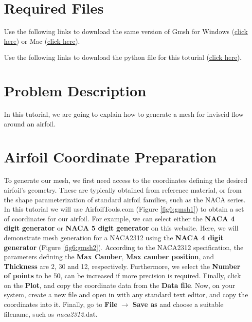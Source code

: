 \section{Required Files}
\begin{gmshnote}
	Use the following links to download the same version of Gmsh for Windows (\href{https://users.encs.concordia.ca/~bvermeir/book/executables/windows/gmsh-3.0.5-Windows64.zip}{\underline{click here}}) or Mac (\href{https://users.encs.concordia.ca/~bvermeir/book/executables/osx/gmsh-3.0.5-MacOSX.dmg}{\underline{click here}}).
\end{gmshnote}
\begin{pythonnote}
	Use the following links to download the python file for this toturial (\href{https://gitlab.com/bvermeir/book-cfd/blob/master/tutorial/tut6_mesh_generation/gmshconverter.py}{\underline{click here}}).
\end{pythonnote}

\section{Problem Description}
In this tutorial, we are going to explain how to generate a mesh for inviscid flow around an airfoil.
\section{Airfoil Coordinate Preparation}
To generate our mesh, we first need access to the coordinates defining the desired airfoil's geometry. These are typically obtained from reference material, or from the shape parameterization of standard airfoil families, such as the NACA series. In this tutorial we will use AirfoilTools.com (Figure \ref{fig6:gmsh1}) to obtain a set of coordinates for our airfoil. For example, we can select either the \textbf{NACA 4 digit generator} or \textbf{NACA 5 digit generator} on this website. Here, we will demonstrate mesh generation for a NACA2312 using the \textbf{NACA 4 digit generator} (Figure \ref{fig6:gmsh2}). According to the NACA2312 specification, the parameters defining the \textbf{Max Camber}, \textbf{Max camber position}, and \textbf{Thickness} are 2, 30 and 12, respectively. Furthermore, we select the \textbf{Number of points} to be 50, can be increased if more precision is required. Finally, click on the \textbf{Plot}, and copy the coordinate data from the \textbf{Data file}. Now, on your system, create a new file and open in with any standard text editor, and copy the coordinates into it. Finally, go to \textbf{File} $\rightarrow$ \textbf{Save as} and choose a suitable filename, such as \textit{naca2312}.dat.

